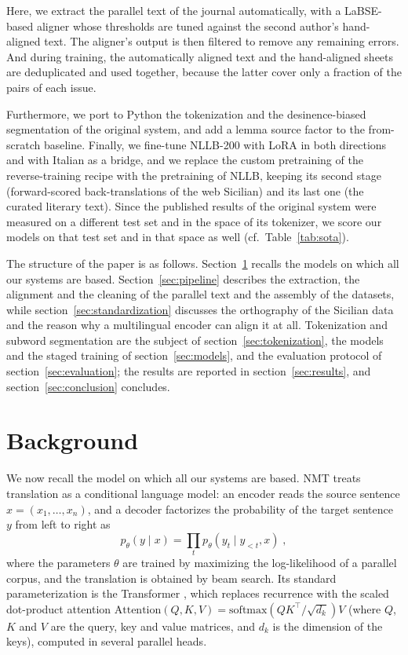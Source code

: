 \documentclass[11pt,a4paper]{article}
\begin{document}


Here, we extract the parallel text of the journal automatically, with a LaBSE-based
aligner whose thresholds are tuned against the second author's hand-aligned text.
The aligner's output is then filtered to remove any remaining errors.
And during training, the automatically aligned text and the hand-aligned sheets
are deduplicated and used together, because
the latter cover only a fraction of the pairs of each issue.

Furthermore, we port to Python the tokenization and the desinence-biased
segmentation of the original system, and add a lemma source factor \citep{sennrich2016linguistic}
to the from-scratch baseline. Finally, we fine-tune NLLB-200 with LoRA in both directions and
with Italian as a bridge, and we replace the custom pretraining of the reverse-training recipe
with the pretraining of NLLB, keeping its second stage (forward-scored back-translations of the
web Sicilian) and its last one (the curated literary text). Since the published results of the
original system were measured on a different test set and in the space of its tokenizer, we
score our models on that test set and in that space as well (cf.\ Table~\ref{tab:sota}).

The structure of the paper is as follows. Section~\ref{sec:background} recalls the models on
which all our systems are based. Section~\ref{sec:pipeline} describes the extraction, the
alignment and the cleaning of the parallel text and the assembly of the datasets, while
section~\ref{sec:standardization} discusses the orthography of the Sicilian data and the reason
why a multilingual encoder can align it at all. Tokenization and subword segmentation are the
subject of section~\ref{sec:tokenization}, the models and the staged training of
section~\ref{sec:models}, and the evaluation protocol of section~\ref{sec:evaluation}; the
results are reported in section~\ref{sec:results}, and section~\ref{sec:conclusion} concludes.



\section{Background}
\label{sec:background}
We now recall the model on which all our systems are based. NMT treats translation as a
conditional language model: an encoder reads the source sentence $x=(x_1,\dots,x_n)$, and a
decoder factorizes the probability of the target sentence $y$ from left to right as
\[
  p_\theta(y\mid x)=\prod_{t} p_\theta(y_t\mid y_{<t},x) \; ,
\]
where the parameters $\theta$ are trained by maximizing the log-likelihood of a parallel corpus,
and the translation is obtained by beam search. Its standard parameterization is the Transformer
\citep{vaswani2017attention}, which replaces recurrence with the scaled dot-product attention
$\mathrm{Attention}(Q,K,V)=\mathrm{softmax}(QK^{\top}/\sqrt{d_k})V$ (where $Q$, $K$ and $V$ are
the query, key and value matrices, and $d_k$ is the dimension of the keys), computed in several
parallel heads.
\end{document}
